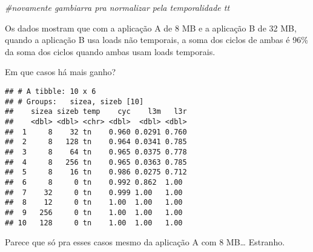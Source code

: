 \documentclass[
]{article}
\newenvironment{Shaded}{\begin{snugshade}}{\end{snugshade}}
\newcommand{\CommentTok}[1]{\textcolor[rgb]{0.56,0.35,0.01}{\textit{#1}}}
\newcommand{\DecValTok}[1]{\textcolor[rgb]{0.00,0.00,0.81}{#1}}
\newcommand{\KeywordTok}[1]{\textcolor[rgb]{0.13,0.29,0.53}{\textbf{#1}}}
\newcommand{\NormalTok}[1]{#1}
\newcommand{\OperatorTok}[1]{\textcolor[rgb]{0.81,0.36,0.00}{\textbf{#1}}}
\newcommand{\StringTok}[1]{\textcolor[rgb]{0.31,0.60,0.02}{#1}}
\begin{document}
\begin{Shaded}
\begin{Highlighting}[]
\CommentTok{#novamente gambiarra pra normalizar pela temporalidade tt}
\end{Highlighting}
\end{Shaded}

Os dados mostram que com a aplicação A de 8 MB e a aplicação B de 32 MB,
quando a aplicação B usa loads não temporais, a soma dos ciclos de ambas
é 96\% da soma dos ciclos quando ambas usam loads temporais.

Em que casos há mais ganho?

\begin{Shaded}
\end{Shaded}

\begin{verbatim}
## # A tibble: 10 x 6
## # Groups:   sizea, sizeb [10]
##    sizea sizeb temp    cyc    l3m   l3r
##    <dbl> <dbl> <chr> <dbl>  <dbl> <dbl>
##  1     8    32 tn    0.960 0.0291 0.760
##  2     8   128 tn    0.964 0.0341 0.785
##  3     8    64 tn    0.965 0.0375 0.778
##  4     8   256 tn    0.965 0.0363 0.785
##  5     8    16 tn    0.986 0.0275 0.712
##  6     8     0 tn    0.992 0.862  1.00 
##  7    32     0 tn    0.999 1.00   1.00 
##  8    12     0 tn    1.00  1.00   1.00 
##  9   256     0 tn    1.00  1.00   1.00 
## 10   128     0 tn    1.00  1.00   1.00
\end{verbatim}

Parece que só pra esses casos mesmo da aplicação A com 8 MB\ldots{}
Estranho.

\begin{Shaded}
\end{Shaded}
\end{document}
